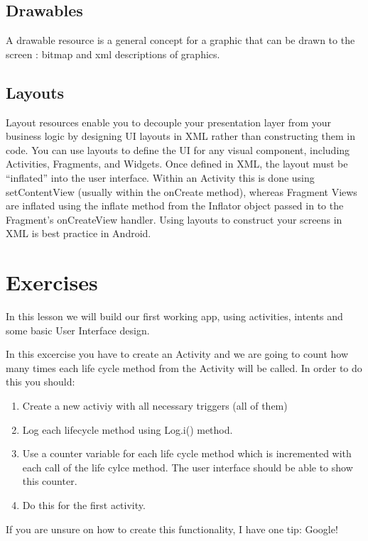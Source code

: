 \subsection{Drawables}
A drawable resource is a general concept for a graphic that can be drawn to the screen : bitmap and xml descriptions of graphics.
\subsection{Layouts}
Layout resources enable you to decouple your presentation layer from your business logic by designing UI layouts in XML rather than constructing them in code. You can use layouts to define the UI for any visual component, including Activities, Fragments, and Widgets. Once defined in XML, the layout must be “inflated” into the user interface. Within an Activity this is done using setContentView (usually within the onCreate method), whereas Fragment Views are inflated using the inflate method from the Inflator object passed in to the Fragment’s onCreateView handler. Using layouts to construct your screens in XML is best practice in Android.

\newpage
\section{Exercises}
In this lesson we will build our first working app, using activities, intents and some basic User Interface design.

\begin{exercise}
	In this excercise you have to create an Activity and we are going to count how many times each life cycle method from the Activity will be called. In order to do this you should:
	\begin{enumerate}
		\item Create a new activiy with all necessary triggers (all of them)
		\item Log each lifecycle method using Log.i() method.
		\item Use a counter variable for each life cycle method which is incremented with each call of the life cylce method. The user interface should be able to show this counter.
		\item Do this for the first activity. 
	\end{enumerate}
\end{exercise}

If you are unsure on how to create this functionality, I have one tip: Google!

